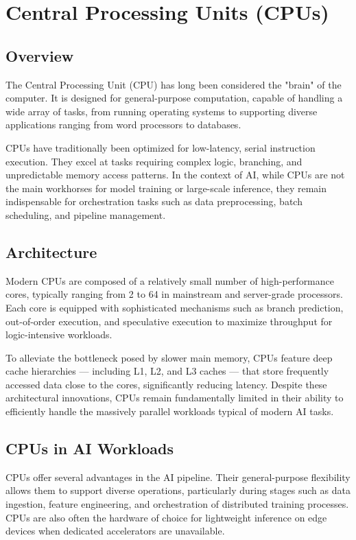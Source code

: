 \documentclass[openany]{book}
\begin{document}
\section{Central Processing Units (CPUs)}

\subsection{Overview}
The Central Processing Unit (CPU) has long been considered the "brain" of the 
computer. It is designed for general-purpose computation, capable of handling a 
wide array of tasks, from running operating systems to supporting diverse 
applications ranging from word processors to databases.

CPUs have traditionally been optimized for low-latency, serial instruction 
execution. They excel at tasks requiring complex logic, branching, and 
unpredictable memory access patterns. In the context of AI, while CPUs are not 
the main workhorses for model training or large-scale inference, they remain 
indispensable for orchestration tasks such as data preprocessing, batch 
scheduling, and pipeline management.

\subsection{Architecture}
Modern CPUs are composed of a relatively small number of high-performance cores, 
typically ranging from 2 to 64 in mainstream and server-grade processors. Each 
core is equipped with sophisticated mechanisms such as branch prediction, 
out-of-order execution, and speculative execution to maximize throughput for 
logic-intensive workloads.

To alleviate the bottleneck posed by slower main memory, CPUs feature deep cache 
hierarchies — including L1, L2, and L3 caches — that store frequently accessed 
data close to the cores, significantly reducing latency. Despite these 
architectural innovations, CPUs remain fundamentally limited in their ability to 
efficiently handle the massively parallel workloads typical of modern AI tasks.

\subsection{CPUs in AI Workloads}
CPUs offer several advantages in the AI pipeline. Their general-purpose 
flexibility allows them to support diverse operations, particularly during 
stages such as data ingestion, feature engineering, and orchestration of 
distributed training processes. CPUs are also often the hardware of choice for 
lightweight inference on edge devices when dedicated accelerators are 
unavailable.
\end{document}

